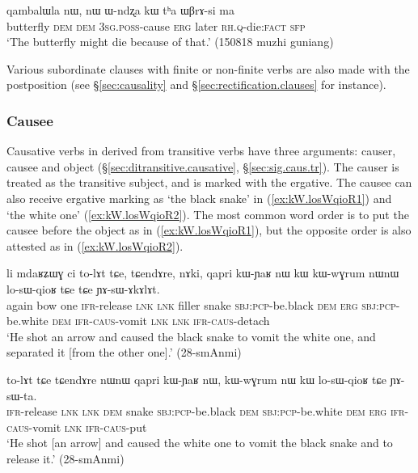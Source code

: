  \begin{exe}
\ex \label{ex:nW.Wndzxa.kW}
 \gll   qambalɯla nɯ, nɯ ɯ-ndʐa kɯ tʰa ɯβrɤ-si ma \\
 butterfly \textsc{dem} \textsc{dem} \textsc{3sg}.\textsc{poss}-cause \textsc{erg}  later \textsc{rh}.\textsc{q}-die:\textsc{fact} \textsc{sfp} \\
 \glt `The butterfly might die because of that.' (150818 muzhi guniang)
\end{exe}
 

Various subordinate clauses with finite or non-finite verbs are also made with the postposition  (see §\ref{sec:causality} and §\ref{sec:rectification.clauses} for instance).

\subsubsection{Causee} \label{sec:causee.kW}
 
Causative verbs in  derived from transitive verbs have three arguments: causer, causee and object (§\ref{sec:ditransitive.causative}, §\ref{sec:sig.caus.tr}). The causer is treated as the transitive subject, and is marked with the ergative. The causee can also receive  ergative marking as  `the black snake' in (\ref{ex:kW.losWqioR1}) and  `the white one' (\ref{ex:kW.losWqioR2}). The most common word order is to put the causee before the object as in (\ref{ex:kW.losWqioR1}), but the opposite order is also attested as in (\ref{ex:kW.losWqioR2}).

\begin{exe}
\ex \label{ex:kW.losWqioR1}
 \gll   li mdaʁʑɯɣ ci to-lɤt tɕe, tɕendɤre, nɤki, qapri kɯ-ɲaʁ nɯ kɯ kɯ-wɣrum nɯnɯ lo-sɯ-qioʁ tɕe tɕe ɲɤ-sɯ-ɤkɤlɤt. \\
 again bow one \textsc{ifr}-release \textsc{lnk} \textsc{lnk} filler snake \textsc{sbj}:\textsc{pcp}-be.black \textsc{dem} \textsc{erg} \textsc{sbj}:\textsc{pcp}-be.white \textsc{dem} \textsc{ifr}-\textsc{caus}-vomit \textsc{lnk} \textsc{lnk} \textsc{ifr}-\textsc{caus}-detach \\
 \glt `He shot an arrow and caused the black snake to vomit the white one, and separated it [from the other one].' (28-smAnmi) 
\end{exe}

\begin{exe}
\ex \label{ex:kW.losWqioR2}
 \gll  to-lɤt tɕe tɕendɤre nɯnɯ qapri kɯ-ɲaʁ nɯ, kɯ-wɣrum nɯ kɯ lo-sɯ-qioʁ tɕe ɲɤ-sɯ-ta. \\
  \textsc{ifr}-release \textsc{lnk} \textsc{lnk} \textsc{dem} snake \textsc{sbj}:\textsc{pcp}-be.black \textsc{dem}  \textsc{sbj}:\textsc{pcp}-be.white \textsc{dem} \textsc{erg} \textsc{ifr}-\textsc{caus}-vomit \textsc{lnk} \textsc{ifr}-\textsc{caus}-put \\
  \glt `He shot [an arrow] and caused the white one to vomit the black snake and to release it.' (28-smAnmi)
\end{exe}

